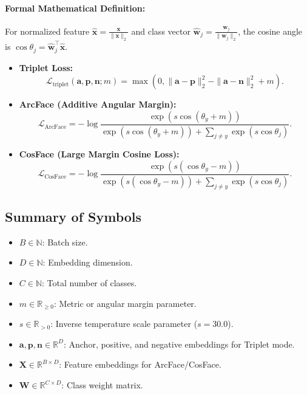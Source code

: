 \documentclass[11pt]{article}
\begin{document}
\paragraph{Formal Mathematical Definition:}
For normalized feature $\hat{\mathbf{x}} = \frac{\mathbf{x}}{\|\mathbf{x}\|_2}$ and class vector $\hat{\mathbf{w}}_j = \frac{\mathbf{w}_j}{\|\mathbf{w}_j\|_2}$, the cosine angle is $\cos\theta_j = \hat{\mathbf{w}}_j^\top \hat{\mathbf{x}}$.
\begin{itemize}
    \item \textbf{Triplet Loss:}
    \begin{equation}
    \mathcal{L}_{\mathrm{triplet}}(\mathbf{a}, \mathbf{p}, \mathbf{n}; m) = \max\left(0, \|\mathbf{a} - \mathbf{p}\|_2^2 - \|\mathbf{a} - \mathbf{n}\|_2^2 + m\right).
    \end{equation}
    \item \textbf{ArcFace (Additive Angular Margin):}
    \begin{equation}
    \mathcal{L}_{\mathrm{ArcFace}} = -\log \frac{\exp(s \cos(\theta_y + m))}{\exp(s \cos(\theta_y + m)) + \sum_{j \neq y} \exp(s \cos\theta_j)}.
    \end{equation}
    \item \textbf{CosFace (Large Margin Cosine Loss):}
    \begin{equation}
    \mathcal{L}_{\mathrm{CosFace}} = -\log \frac{\exp(s (\cos\theta_y - m))}{\exp(s (\cos\theta_y - m)) + \sum_{j \neq y} \exp(s \cos\theta_j)}.
    \end{equation}
\end{itemize}

\subsection{Summary of Symbols}
\begin{itemize}
    \item $B \in \mathbb{N}$: Batch size.
    \item $D \in \mathbb{N}$: Embedding dimension.
    \item $C \in \mathbb{N}$: Total number of classes.
    \item $m \in \mathbb{R}_{\ge 0}$: Metric or angular margin parameter.
    \item $s \in \mathbb{R}_{>0}$: Inverse temperature scale parameter ($s = 30.0$).
    \item $\mathbf{a}, \mathbf{p}, \mathbf{n} \in \mathbb{R}^D$: Anchor, positive, and negative embeddings for Triplet mode.
    \item $\mathbf{X} \in \mathbb{R}^{B \times D}$: Feature embeddings for ArcFace/CosFace.
    \item $\mathbf{W} \in \mathbb{R}^{C \times D}$: Class weight matrix.
\end{itemize}
\end{document}

